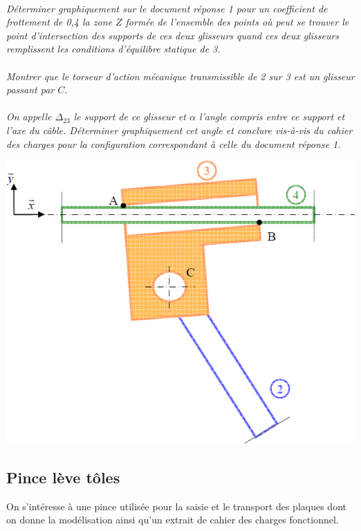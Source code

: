 \documentclass[11pt,oneside]{article}
\begin{document}
\paragraph{}
\textit{Déterminer graphiquement sur le document réponse 1 pour un coefficient de frottement de 0,4 la zone $Z$ formée de l'ensemble des points où peut se trouver le point d'intersection des supports de ces deux glisseurs quand ces deux glisseurs remplissent les conditions d'équilibre statique de 3.}

\paragraph{}
\textit{Montrer que le torseur d'action mécanique transmissible de 2 sur 3 est un glisseur passant par $C$.}

\paragraph{}
\textit{On appelle $\Delta_{23}$ le support de ce glisseur et $\alpha$ l'angle compris entre ce support et l'axe du câble. Déterminer graphiquement cet angle et conclure vis-à-vis du cahier des charges pour la configuration correspondant à celle du document réponse 1.}


\begin{center}
\includegraphics[width=.7\textwidth]{png/img2.png}
\end{center}



\newpage


\setcounter{paragraph}{0}

\subsection*{Pince lève tôles}
On s'intéresse à une pince utilisée pour la saisie et le transport des plaques dont on donne la modélisation ainsi qu'un extrait de cahier des charges fonctionnel.
\end{document}
